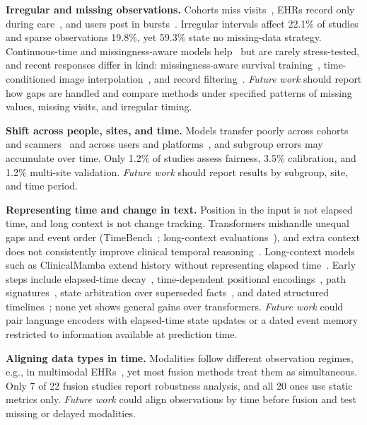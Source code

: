 \documentclass[11pt]{article}
\theoremstyle{plain}
\theoremstyle{definition}
\theoremstyle{remark}
\begin{document}
\noindent\textbf{Irregular and missing observations.} Cohorts miss visits~\citep{9342532,9377173}, EHRs record only during care~\citep{8904478}, and users post in bursts~\citep{harrigian-dredze-2022-now,tsakalidis-etal-2022-identifying}. Irregular intervals affect 22.1\% of studies and sparse observations 19.8\%, yet 59.3\% state no missing-data strategy. Continuous-time and missingness-aware models help~\citep{9871150,10340079} but are rarely stress-tested, and recent responses differ in kind: missingness-aware survival training~\citep{11373479}, time-conditioned image interpolation~\citep{11437527}, and record filtering~\citep{hayat-etal-2025-context}. \emph{Future work} should report how gaps are handled and compare methods under specified patterns of missing values, missing visits, and irregular timing.

\noindent\textbf{Shift across people, sites, and time.} Models transfer poorly across cohorts and scanners~\citep{10483639,10635830} and across users and platforms~\citep{matero-etal-2024-using}, and subgroup errors may accumulate over time. Only 1.2\% of studies assess fairness, 3.5\% calibration, and 1.2\% multi-site validation. \emph{Future work} should report results by subgroup, site, and time period.

\noindent\textbf{Representing time and change in text.} Position in the input is not elapsed time, and long context is not change tracking. Transformers mishandle unequal gaps and event order (TimeBench~\citep{chu-etal-2024-timebench}; long-context evaluations~\citep{li2024long}), and extra context does not consistently improve clinical temporal reasoning~\citep{kruse-etal-2025-large}. Long-context models such as ClinicalMamba extend history without representing elapsed time~\citep{yang-etal-2024-clinicalmamba}. Early steps include elapsed-time decay~\citep{hills-etal-2026-multistream}, time-dependent positional encodings~\citep{tseriotou2024tempoformer}, path signatures~\citep{tseriotou-etal-2023-sequential}, state arbitration over superseded facts~\citep{zhao-etal-2026-beyond-retrieval}, and dated structured timelines~\citep{zhou-etal-2026-radtimeline}; none yet shows general gains over transformers. \emph{Future work} could pair language encoders with elapsed-time state updates or a dated event memory restricted to information available at prediction time.

\noindent\textbf{Aligning data types in time.} Modalities follow different observation regimes, e.g., in multimodal EHRs~\citep{9874547,10337299,10809027}, yet most fusion methods treat them as simultaneous. Only 7 of 22 fusion studies report robustness analysis, and all 20  ones use static metrics only. \emph{Future work} could align observations by time before fusion and test missing or delayed modalities.
\end{document}
